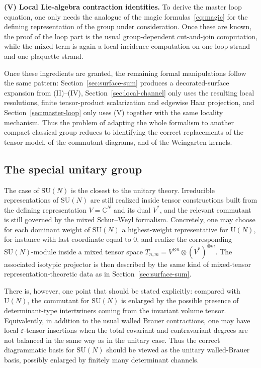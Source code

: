 \documentclass[11pt,a4paper,reqno]{article}
\theoremstyle{definition}
\theoremstyle{remark}
\newcommand\SU{{\mathrm{SU}}}
\newcommand\U{{\mathrm U}}
\begin{document}
\medskip

\noindent
\textbf{(V) Local Lie-algebra contraction identities.}
To derive the master loop equation, one only needs the analogue of the magic formulas~\eqref{eq:magic} for the defining representation of the group under consideration. Once these are known, the proof of the loop part is the usual group-dependent cut-and-join computation, while the mixed term is again a local incidence computation on one loop strand and one plaquette strand.

\medskip

Once these ingredients are granted, the remaining formal manipulations follow the same pattern: Section~\ref{sec:surface-sum} produces a decorated-surface expansion from (II)--(IV), Section~\ref{sec:local-channel} only uses the resulting local resolutions, finite tensor-product scalarization and edgewise Haar projection, and Section~\ref{sec:master-loop} only uses (V) together with the same locality mechanism. Thus the problem of adapting the whole formalism to another compact classical group reduces to identifying the correct replacements of the tensor model, of the commutant diagrams, and of the Weingarten kernels.

\subsection{The special unitary group}

The case of $\SU(N)$ is the closest to the unitary theory. Irreducible representations of $\SU(N)$ are still realized inside tensor constructions built from the defining representation $V=\mathbb C^N$ and its dual $V^*$, and the relevant commutant is still governed by the mixed Schur--Weyl formalism. Concretely, one may choose for each dominant weight of $\SU(N)$ a highest-weight representative for $\U(N)$, for instance with last coordinate equal to $0$, and realize the corresponding $\SU(N)$-module inside a mixed tensor space $T_{n,m}=V^{\otimes n}\otimes (V^*)^{\otimes m}.$ The associated isotypic projector is then described by the same kind of mixed-tensor representation-theoretic data as in Section~\ref{sec:surface-sum}.

There is, however, one point that should be stated explicitly: compared with $\U(N)$, the commutant for $\SU(N)$ is enlarged by the possible presence of determinant-type intertwiners coming from the invariant volume tensor. Equivalently, in addition to the usual walled Brauer contractions, one may have local $\varepsilon$-tensor insertions when the total covariant and
contravariant degrees are not balanced in the same way as in the unitary case. Thus the correct diagrammatic basis for $\SU(N)$ should be viewed as the unitary walled-Brauer basis, possibly enlarged by finitely many determinant channels.
\end{document}
